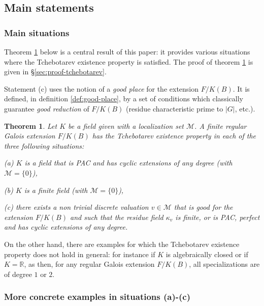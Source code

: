 \documentclass[12pt,english]{amsart}
\newtheorem{theorem}{Theorem}[section]
\newtheorem{twisting lemma}[theorem]{Twisting lemma}
\begin{document}
 \subsection{Main statements} \label{ssec:examples}

\subsubsection{Main situations} \label{ssec:main-situations}
Theorem \ref{thm:tchebotarev} below is a central result of this paper: it provides various situations where the {Tchebotarev existence property} is satisfied. The proof of theorem \ref{thm:tchebotarev}  
is given in \S \ref{sec:proof-tchebotarev}.

Statement (c) uses the notion of a {\it good place} for the extension $F/K(B)$. It is defined, in de\-fi\-ni\-tion \ref{def:good-place}, by a set of conditions which classically guarantee {\it good reduction} of $F/K(B)$ (residue characteristic prime to $|G|$, etc.). 

\begin{theorem} \label{thm:tchebotarev}
Let $K$ be a field given with a localization set ${\mathcal M}$. A finite regular Galois extension $F/K(B)$ has the {Tchebotarev existence property} 
in each of the three following situations:
\vskip 1mm

\noindent
{\rm (a)} $K$ is a field that is PAC and has cyclic extensions of any degree {\rm (}with ${\mathcal M}=\{0\}${\rm )},
\vskip 1mm

\noindent
{\rm (b)} $K$ is a finite field {\rm (}with ${\mathcal M}=\{0\}${\rm )},
\vskip 1mm

\noindent
{\rm (c)} there exists a non trivial discrete valuation $v\in {\mathcal M}$ that is good for the extension $F/K(B)$ and such that the residue field $\kappa_v$ is finite, or is PAC, perfect and has cyclic extensions of any degree. 
\end{theorem}

On the other hand, there are examples for which the Tchebotarev existence property does not hold in general: for instance if $K$ is algebraically closed or if $K={\mathbb{R}}$, as then, for any regular Galois extension $F/K(B)$, all specializations are of degree $1$ or $2$. 

\subsubsection{More concrete examples in situations {\rm (a)-(c)}} \label{ssec:more-concrete-ex}
\end{document}
